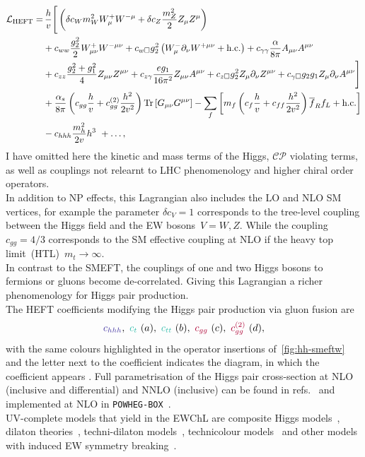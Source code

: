 \begin{align}\nonumber
	\mathcal{L}_{\mathrm{HEFT}} = & \, \frac{h}{v} \Bigg[  \left( \delta c_W m_W^2 W_{\mu}^+W^{-\mu} +\delta c_Z \frac{m_Z^2}{2} Z_\mu Z^\mu\right)  \\\nonumber
	&+c_{ww}\frac{g_2^2}{2}W_{\mu\nu}^+W^{-\mu\nu} + c_{w\square} g_2^2\left(W_{\mu}^-\partial_\nu W^{+\mu\nu} + \text{h.c.}\right) +  c_{\gamma\gamma}\frac{\alpha}{8 \pi}A_{\mu\nu}A^{\mu\nu} \\\nonumber
	& +c_{zz}\frac{g_2^2 + g_1^2}{4} Z_{\mu\nu}Z^{\mu\nu}+ c_{z\gamma}\frac{e g_1}{16 \pi^2}Z_{\mu\nu}A^{\mu\nu}
	+c_{z\square}g_2^2Z_\mu\partial_\nu Z^{\mu\nu}
	+c_{\gamma \square}g_2 g_1 Z_\mu\partial_\nu A^{\mu\nu}
	\Bigg]\\\nonumber
	&+ \frac{\alpha_s}{8 \pi} \left( c_{gg} \frac{h}{v} +  c_{gg}^{(2)} \frac{h^2}{2 v^2}\right) \mbox{Tr}\,[G_{\mu\nu} G^{\mu\nu}]
	-\sum_f \left[ m_f \left(c_f \frac{h}{v} + c _{ff} \frac{h^2}{2v^2}\right) \overline{f}_{R}f_{L}+\text{h.c.}\right]\\
	& - c_{hhh} \frac{m_h^2}{2 v} h^3\ + \dots,\label{eq:coupl_def}
\end{align}
I have omitted here the kinetic and mass terms of the Higgs, $\mathcal{CP}$ violating terms, as well as couplings not relearnt to LHC phenomenology and higher chiral order operators. \\
In addition to NP effects, this Lagrangian also includes the LO and NLO SM vertices, for example the parameter $\delta c_V=1$ corresponds to the tree-level coupling between the Higgs field and the EW bosons~$ V=W, Z$. While the coupling $c_{gg}= 4/3$ corresponds to the SM effective coupling at NLO if the heavy top limit~(HTL)~$m_t \to \infty$. \\
In contrast to the SMEFT, the couplings of one and two Higgs bosons to fermions or gluons become de-correlated. Giving this Lagrangian a richer phenomenology for Higgs pair production.  \\
The HEFT coefficients modifying the Higgs pair production via gluon fusion are 
\begin{equation}
	\textcolor[HTML]{4334a0}{c_{hhh} }, \ 	\textcolor[HTML]{2ebbaa}{c_t}\ (a) , \  	\textcolor[HTML]{2ebbaa}{c_{tt}} \ (b), \  \textcolor[HTML]{ae0034}{c_{gg}} \ (c), \  \textcolor[HTML]{ae0034}{c_{gg}^{(2)}} \ (d),
\end{equation}
with the same colours highlighted in the operator insertions of~\autoref{fig:hh-smeftw} and the letter next to the coefficient indicates the diagram, in which the coefficient appears .  Full parametrisation of the Higgs pair cross-section at NLO (inclusive and differential) and NNLO (inclusive)  can be found in refs.~\cite{Buchalla:2018yce,Capozi:2019xsi,deFlorian:2021azd} and implemented at NLO in \texttt{POWHEG-BOX}~\cite{Heinrich:2020ckp}. \\ UV-complete models that yield in the EWChL are composite Higgs models~\cite{Contino:2010rs,Panico:2015jxa,AGASHE2005165}, dilaton  theories~\cite{PhysRevLett.100.111802}, techni-dilaton models~\cite{Habaa:2010rbs}, technicolour models~\cite{Delgado:2010bb} and other models with induced EW symmetry breaking~\cite{Galloway:2013dma,Chang:2014ida}.
